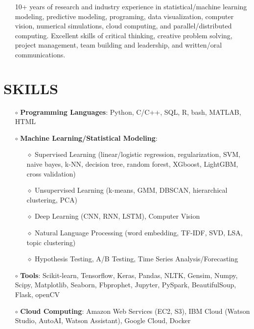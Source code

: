 \documentclass[10pt]{res}
\newcommand{\blockline}{\noindent\hspace{-0.03\textwidth}
{\rule{1.03\textwidth}{0.8pt}}}
\newcommand{\blocklinethin}{\noindent\hspace{-0.03\textwidth}
{\rule{1.03\textwidth}{0.3pt}}}
\begin{document}
\begin{resume}

\vspace{-0.3cm}

\noindent{\blocklinethin}
\begin{itemize}[leftmargin=-0.4cm]
\item[] 10+ years of research and industry experience in statistical/machine learning modeling, predictive modeling, programing, data visualization, computer vision, numerical simulations, cloud computing, and parallel/distributed computing. Excellent skills of critical thinking, creative problem solving, project management, team building and leadership, and written/oral communications.

\end{itemize}

\vspace{-0.3cm}
  
\section{\large SKILLS}
\vspace{-0.2cm}
\noindent{\blockline}
\begin{itemize}[leftmargin=0.0cm]
\item[$\circ$]{\textbf{Programming Languages}: Python,  C/C++, SQL, R, bash, MATLAB, HTML}

\item[$\circ$]{\textbf{Machine Learning/Statistical Modeling}}: 

 \begin{itemize}[leftmargin=0.35cm]
\item[$\diamond$] Supervised Learning (linear/logistic regression, regularization, SVM, naive bayes, k-NN, decision tree, random forest, XGboost, LightGBM, cross validation)
\item[$\diamond$] Unsupervised Learning (k-means, GMM, DBSCAN, hierarchical clustering, PCA)
\item[$\diamond$] Deep Learning (CNN, RNN, LSTM), Computer Vision
\item[$\diamond$] Natural Language Processing (word embedding, TF-IDF, SVD, LSA, topic clustering)
\item[$\diamond$] Hypothesis Testing, A/B Testing, Time Series Analysis/Forecasting
 \end{itemize}

\item[$\circ$]{\textbf{Tools}: Scikit-learn, Tensorflow, Keras, Pandas, NLTK, Gensim, Numpy, Scipy, Matplotlib, Seaborn, Fbprophet, Jupyter, PySpark, BeautifulSoup, Flask,  openCV}
\item[$\circ$]{\textbf{Cloud Computing}: Amazon Web Services (EC2, S3), IBM Cloud (Watson Studio, AutoAI, Watson Assistant), Google Cloud, Docker}


\end{itemize}
\end{resume}
\end{document}
